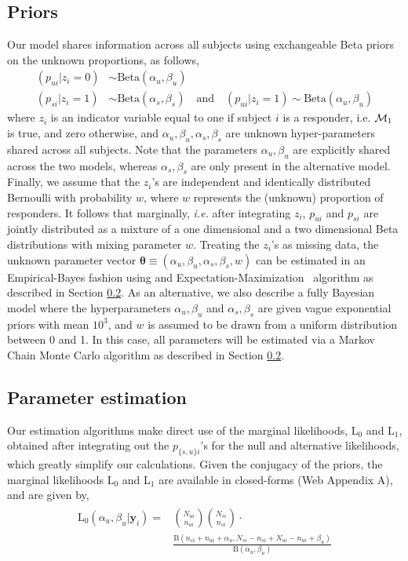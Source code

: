 \documentclass[useAMS,referee,usenatbib]{biom}
\begin{document}
\subsection{Priors}
\label{ss:priors}
Our model shares information across all subjects using exchangeable Beta priors on the unknown proportions, as follows, 
 \begin{align*}
(p_{ui} | z_{i}=0)  &\sim \mathrm{Beta}(\alpha_u, \beta_u)\\
(p_{si} | z_{i}=1)  &\sim \mathrm{Beta}(\alpha_s,\beta_s) \quad\mathrm{and}\quad (p_{ui}|z_{i}=1) \sim \mathrm{Beta}(\alpha_u, \beta_u)
 \end{align*}
where $z_i$ is an indicator variable equal to one if subject $i$ is a responder, i.e.  ${\cal M}_1$ is true, and zero otherwise, and $\alpha_u, \beta_u, \alpha_s,\beta_s$ are unknown hyper-parameters shared across all subjects. Note that the parameters $\alpha_u, \beta_u$ are explicitly shared across the two models, whereas $\alpha_s,\beta_s$ are only present in the alternative model. Finally, we assume that the $z_i$'s are independent and identically distributed Bernoulli with probability $w$, where $w$ represents the (unknown) proportion of responders. It follows that marginally, \textit{i.e.} after integrating $z_i$, $p_{ui}$ and $p_{si}$ are jointly distributed as a mixture of a one dimensional and a two dimensional Beta distributions with mixing parameter $w$. Treating the $z_i$'s as missing data, the unknown parameter vector $\boldsymbol\theta\equiv(\alpha_u, \beta_u, \alpha_s,\beta_s, w)$ can be estimated in an Empirical-Bayes fashion using and Expectation-Maximization~\citep{Dempster:1977ul} algorithm as described in Section \ref{s:estimation}. As an alternative, we also describe a fully Bayesian model where the hyperparameters $\alpha_u, \beta_u$ and $\alpha_s, \beta_s$ are given vague exponential priors with mean $10^3$, and $w$ is assumed to be drawn from a uniform distribution between 0 and 1. In this case, all parameters will be estimated via a Markov Chain Monte Carlo algorithm as described in Section \ref{s:estimation}. 

\subsection{Parameter estimation}
\label{s:estimation}
Our estimation algorithms make direct use of the marginal likelihoods, $\mathrm{L}_0$ and $\mathrm{L}_1$, obtained after integrating out the $p_{\{s,u\}i}$'s for the null and alternative likelihoods, which greatly simplify our calculations. Given the conjugacy of the priors, the marginal likelihoods $\mathrm{L}_0$ and $\mathrm{L}_1$ are available in closed-forms (Web Appendix A), and are given by,
 \begin{align*}
 \begin{split}
  	\mathrm{L}_0(\alpha_u,\beta_u|\mathbf{y}_i)
	=&\binom{N_{ui}}{n_{ui}}\binom{N_{si}}{n_{si}}\cdot\\ &\frac{\mathrm{B}(n_{si}+n_{ui}+\alpha_u,N_{si}-n_{si}+N_{ui}-n_{ui}+\beta_u)}{\mathrm{B}(\alpha_u,\beta_u)}
	\end{split}
 \end{align*} 
 
\end{document}
